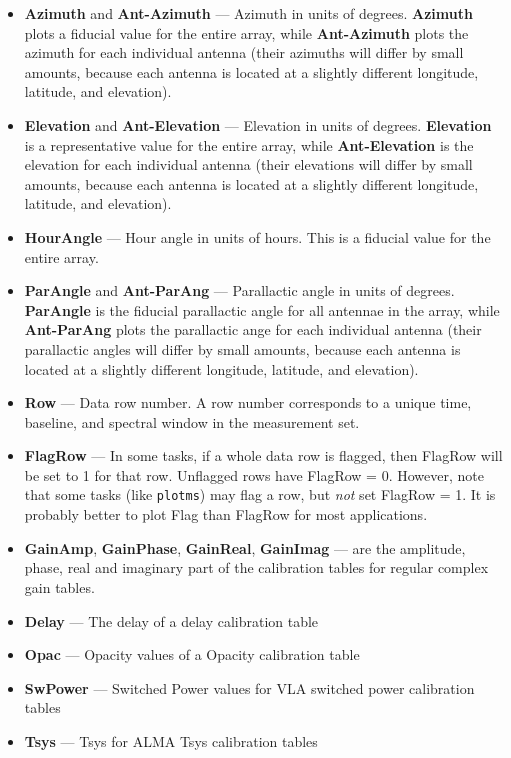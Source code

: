\begin{itemize}
\item {\bf Azimuth} and {\bf Ant-Azimuth} --- Azimuth in units of degrees. {\bf Azimuth} plots a fiducial value for the entire array, while {\bf Ant-Azimuth} plots the azimuth for each individual antenna (their azimuths will differ by small amounts, because each antenna is located at a slightly different longitude, latitude, and elevation).

\item {\bf Elevation} and {\bf Ant-Elevation} --- Elevation in units
  of degrees. {\bf Elevation} is a representative value for the entire
  array, while {\bf Ant-Elevation} is the elevation for each
  individual antenna (their elevations will differ by small amounts,
  because each antenna is located at a slightly different longitude,
  latitude, and elevation).

\item {\bf HourAngle} --- Hour angle in units of hours. This is a fiducial value for the entire array.

\item {\bf ParAngle} and {\bf Ant-ParAng} --- Parallactic angle in
  units of degrees. {\bf ParAngle} is the fiducial parallactic angle
  for all antennae in the array, while {\bf Ant-ParAng} plots the
  parallactic ange for each individual antenna (their parallactic
  angles will differ by small amounts, because each antenna is located
  at a slightly different longitude, latitude, and elevation).

\item {\bf Row} --- Data row number. A row number corresponds to a
  unique time, baseline, and spectral window in the measurement set.

\item {\bf FlagRow} --- In some tasks, if a whole data row is flagged,
  then FlagRow will be set to 1 for that row. Unflagged rows have
  FlagRow = 0. However, note that some tasks (like {\tt plotms}) may
  flag a row, but {\it not} set FlagRow = 1. It is probably better to
  plot Flag than FlagRow for most applications.

\item {\bf GainAmp}, {\bf GainPhase}, {\bf GainReal}, {\bf GainImag} ---
  are the amplitude, phase, real and imaginary part of the calibration
  tables for regular complex gain tables. 

\item {\bf Delay} --- The delay of a delay calibration table

\item {\bf Opac} --- Opacity values of a Opacity calibration table

\item {\bf SwPower} --- Switched Power values for VLA switched power
  calibration tables

\item {\bf Tsys} --- Tsys for ALMA Tsys calibration tables

\end{itemize}

